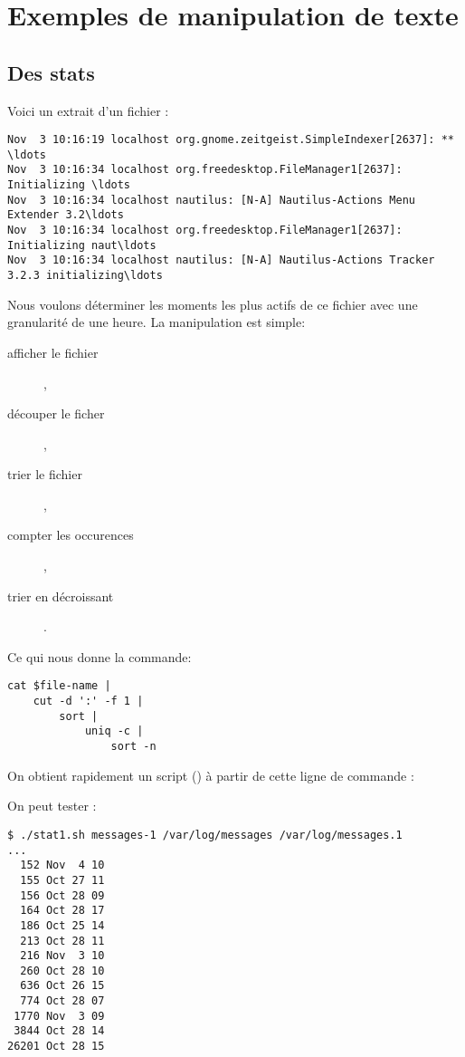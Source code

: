 
\section{Exemples de manipulation de texte}

\subsection{Des stats}
Voici un extrait d'un fichier :

\begin{lstlisting}
Nov  3 10:16:19 localhost org.gnome.zeitgeist.SimpleIndexer[2637]: ** \ldots
Nov  3 10:16:34 localhost org.freedesktop.FileManager1[2637]: Initializing \ldots
Nov  3 10:16:34 localhost nautilus: [N-A] Nautilus-Actions Menu Extender 3.2\ldots
Nov  3 10:16:34 localhost org.freedesktop.FileManager1[2637]: Initializing naut\ldots
Nov  3 10:16:34 localhost nautilus: [N-A] Nautilus-Actions Tracker 3.2.3 initializing\ldots
\end{lstlisting}

Nous voulons déterminer les moments les plus actifs de ce fichier avec une granularité de une heure.
La manipulation est simple:

\begin{description}
    \item[afficher le fichier] ,
    \item[découper le ficher] ,
    \item[trier le fichier] ,
    \item[compter les occurences] ,
    \item[trier en décroissant] .
\end{description}

Ce qui nous donne la commande:

\begin{lstlisting}
cat $file-name |
    cut -d ':' -f 1 |
        sort |
            uniq -c |
                sort -n
\end{lstlisting}

On obtient rapidement un script () à partir de cette ligne de com\-man\-de :



On peut tester :

\begin{lstlisting}
$ ./stat1.sh messages-1 /var/log/messages /var/log/messages.1
...
  152 Nov  4 10
  155 Oct 27 11
  156 Oct 28 09
  164 Oct 28 17
  186 Oct 25 14
  213 Oct 28 11
  216 Nov  3 10
  260 Oct 28 10
  636 Oct 26 15
  774 Oct 28 07
 1770 Nov  3 09
 3844 Oct 28 14
26201 Oct 28 15
\end{lstlisting}

